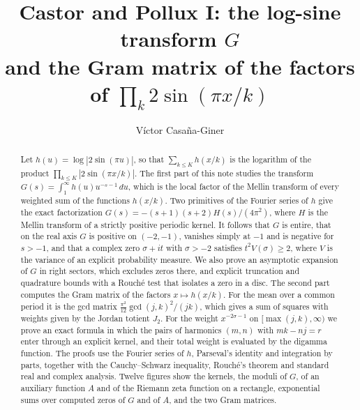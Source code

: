 \documentclass[11pt,reqno]{amsart}
\numberwithin{equation}{section}
\theoremstyle{plain}
\theoremstyle{definition}
\theoremstyle{remark}
\begin{document}
\title[Castor and Pollux I]{Castor and Pollux I: the log-sine transform $G$\\ and the Gram matrix of the factors of $\prod_k2\sin(\pi x/k)$}
\author{V\'ictor Casa\~na-Giner}
\date{}

\begin{abstract}
Let $h(u)=\log|2\sin(\pi u)|$, so that $\sum_{k\le K}h(x/k)$ is the logarithm of the product $\prod_{k\le K}|2\sin(\pi x/k)|$. The first part of this note studies the transform $G(s)=\int_1^\infty h(u)u^{-s-1}\,du$, which is the local factor of the Mellin transform of every weighted sum of the functions $h(x/k)$. Two primitives of the Fourier series of $h$ give the exact factorization $G(s)=-(s+1)(s+2)H(s)/(4\pi^2)$, where $H$ is the Mellin transform of a strictly positive periodic kernel. It follows that $G$ is entire, that on the real axis $G$ is positive on $(-2,-1)$, vanishes simply at $-1$ and is negative for $s>-1$, and that a complex zero $\sigma+it$ with $\sigma>-2$ satisfies $t^2V(\sigma)\ge2$, where $V$ is the variance of an explicit probability measure. We also prove an asymptotic expansion of $G$ in right sectors, which excludes zeros there, and explicit truncation and quadrature bounds with a Rouch\'e test that isolates a zero in a disc. The second part computes the Gram matrix of the factors $x\mapsto h(x/k)$. For the mean over a common period it is the gcd matrix $\frac{\pi^2}{12}\gcd(j,k)^2/(jk)$, which gives a sum of squares with weights given by the Jordan totient $J_2$. For the weight $x^{-2\sigma-1}$ on $[\max(j,k),\infty)$ we prove an exact formula in which the pairs of harmonics $(m,n)$ with $mk-nj=r$ enter through an explicit kernel, and their total weight is evaluated by the digamma function. The proofs use the Fourier series of $h$, Parseval's identity and integration by parts, together with the Cauchy--Schwarz inequality, Rouch\'e's theorem and standard real and complex analysis. Twelve figures show the kernels, the moduli of $G$, of an auxiliary function $A$ and of the Riemann zeta function on a rectangle, exponential sums over computed zeros of $G$ and of $A$, and the two Gram matrices.
\end{abstract}


\maketitle
\tableofcontents
\end{document}
